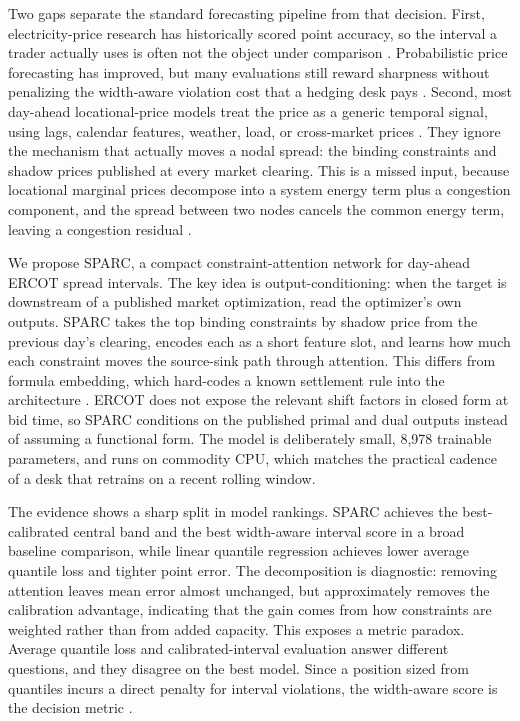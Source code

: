 \documentclass[twoside]{article}
\begin{document}
Two gaps separate the standard forecasting pipeline from that decision. First, electricity-price research has historically scored point accuracy, so the interval a trader actually uses is often not the object under comparison \citep{lago2020forecasting, hong2020energy}. Probabilistic price forecasting has improved, but many evaluations still reward sharpness without penalizing the width-aware violation cost that a hedging desk pays \citep{gneiting2007strictly, bracher2021evaluating}. Second, most day-ahead locational-price models treat the price as a generic temporal signal, using lags, calendar features, weather, load, or cross-market prices \citep{toubeau2020capturing, das2021forecasting}. They ignore the mechanism that actually moves a nodal spread: the binding constraints and shadow prices published at every market clearing. This is a missed input, because locational marginal prices decompose into a system energy term plus a congestion component, and the spread between two nodes cancels the common energy term, leaving a congestion residual \citep{hong2020locational}.

We propose SPARC, a compact constraint-attention network for day-ahead ERCOT spread intervals. The key idea is output-conditioning: when the target is downstream of a published market optimization, read the optimizer's own outputs. SPARC takes the top binding constraints by shadow price from the previous day's clearing, encodes each as a short feature slot, and learns how much each constraint moves the source-sink path through attention. This differs from formula embedding, which hard-codes a known settlement rule into the architecture \citep{yu2026marketruleinformed}. ERCOT does not expose the relevant shift factors in closed form at bid time, so SPARC conditions on the published primal and dual outputs instead of assuming a functional form. The model is deliberately small, 8{,}978 trainable parameters, and runs on commodity CPU, which matches the practical cadence of a desk that retrains on a recent rolling window.

The evidence shows a sharp split in model rankings. SPARC achieves the best-calibrated central band and the best width-aware interval score in a broad baseline comparison, while linear quantile regression achieves lower average quantile loss and tighter point error. The decomposition is diagnostic: removing attention leaves mean error almost unchanged, but approximately removes the calibration advantage, indicating that the gain comes from how constraints are weighted rather than from added capacity. This exposes a metric paradox. Average quantile loss and calibrated-interval evaluation answer different questions, and they disagree on the best model. Since a position sized from quantiles incurs a direct penalty for interval violations, the width-aware score is the decision metric \citep{hobbs2022probabilistic}.
\end{document}
